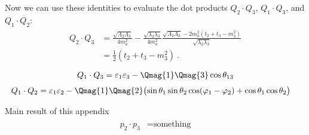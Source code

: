 Now we can use these identities to evaluate the dot products $Q_2 \cdot Q_3$, $Q_1 \cdot Q_3$, and $Q_1 \cdot Q_2$:
\begin{gather}
    \begin{aligned}
        Q_2 \cdot Q_3 
        &= 
        \frac{\sqrt{\Lambda_2 \Lambda_3}}{4 m_a^2} 
        - \frac{\sqrt{\lambda_2 \lambda_3}}{4 m_a^2} 
        \frac{\sqrt{\Lambda_2 \Lambda_3} - 2m_a^2(t_2 + t_3 - m_3^2)}{\sqrt{\lambda_2 \lambda_3}} \\
        &= \frac{1}{2}(t_2 + t_3 - m_3^2) \ . 
    \end{aligned}
\end{gather}
\begin{gather}
    \begin{aligned}
        Q_1 \cdot Q_3 = \varepsilon_1 \varepsilon_3 - \Qmag{1}\Qmag{3} \cos \theta_{13}
    \end{aligned}
\end{gather}
\begin{gather}
    \begin{aligned}
        Q_1 \cdot Q_2 
            &= 
            \varepsilon_1 \varepsilon_2
                - \Qmag{1} \Qmag{2} 
                \bigl(
                    \sin \theta_1 \sin \theta_2 \cos(\varphi_1 - \varphi_2) + \cos \theta_1 \cos \theta_2
                \bigr)
    \end{aligned}
\end{gather}
\begin{bluenv}{Main result of this appendix}
\vspace{-3ex}
    \begin{gather}
        \begin{aligned}
            p_2 \cdot p_3 &= 
            \text{something}
        \end{aligned}
    \end{gather}
\end{bluenv}
